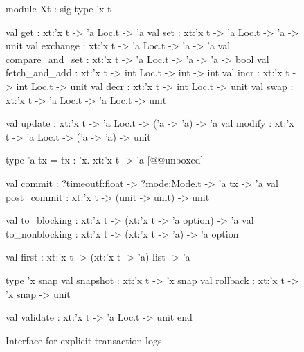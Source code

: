 \begin{figure}
\begin{ocamlcode}
module Xt : sig
  type 'x t
  
  val get : xt:'x t -> 'a Loc.t -> 'a
  val set : xt:'x t -> 'a Loc.t -> 'a -> unit
  val exchange : xt:'x t -> 'a Loc.t -> 'a -> 'a
  val compare_and_set : xt:'x t -> 'a Loc.t -> 'a -> 'a -> bool
  val fetch_and_add : xt:'x t -> int Loc.t -> int -> int
  val incr : xt:'x t -> int Loc.t -> unit
  val decr : xt:'x t -> int Loc.t -> unit
  val swap : xt:'x t -> 'a Loc.t -> 'a Loc.t -> unit
  
  val update : xt:'x t -> 'a Loc.t -> ('a -> 'a) -> 'a
  val modify : xt:'x t -> 'a Loc.t -> ('a -> 'a) -> unit
  
  type 'a tx = { tx : 'x. xt:'x t -> 'a } [@@unboxed]
  
  val commit : ?timeoutf:float -> ?mode:Mode.t -> 'a tx -> 'a
  val post_commit : xt:'x t -> (unit -> unit) -> unit
  
  val to_blocking : xt:'x t -> (xt:'x t -> 'a option) -> 'a
  val to_nonblocking : xt:'x t -> (xt:'x t -> 'a) -> 'a option
  
  val first : xt:'x t -> (xt:'x t -> 'a) list -> 'a
  
  type 'x snap
  val snapshot : xt:'x t -> 'x snap
  val rollback : xt:'x t -> 'x snap -> unit
  
  val validate : xt:'x t -> 'a Loc.t -> unit
end
\end{ocamlcode}
\caption{Interface for explicit transaction logs}
\label{fig:xt_interface}
\end{figure}